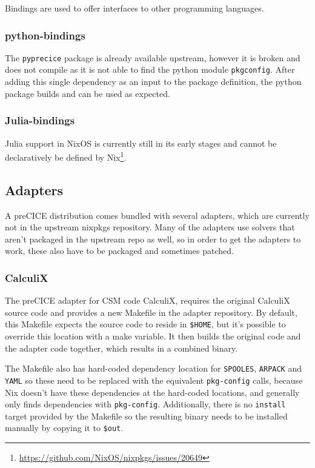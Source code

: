 \documentclass[conference,final,a4paper]{IEEEtran}
\begin{document}
Bindings are used to offer interfaces to other programming languages.

\subsubsection{python-bindings}

The \texttt{pyprecice} package is already available upstream, however it is broken and does not compile as it is not able to find the python module \texttt{pkgconfig}.
After adding this single dependency as an input to the package definition, the python package builds and can be used as expected.

\subsubsection{Julia-bindings}

Julia support in NixOS is currently still in its early stages and cannot be declaratively be defined by Nix\footnote{\url{https://github.com/NixOS/nixpkgs/issues/20649}}.

\subsection{Adapters}

A preCICE distribution comes bundled with several adapters, which are currently not in the upstream nixpkgs repository.
Many of the adapters use solvers that aren't packaged in the upstream repo as well, so in order to get the adapters to work, these also have to be packaged and sometimes patched.\\

\subsubsection{CalculiX}

The preCICE adapter for CSM code CalculiX, requires the original CalculiX source code and provides a new Makefile in the adapter repository.
By default, this Makefile expects the source code to reside in \texttt{\$HOME}, but it's possible to override this location with a make variable.
It then builds the original code and the adapter code together, which results in a combined binary.

The Makefile also has hard-coded dependency location for \texttt{SPOOLES}, \texttt{ARPACK} and \texttt{YAML} so these need to be replaced with the equivalent \texttt{pkg-config} calls, because Nix doesn't have these dependencies at the hard-coded locations, and generally only finds dependencies with \texttt{pkg-config}.
Additionally, there is no \texttt{install} target provided by the Makefile so the resulting binary needs to be installed manually by copying it to \texttt{\$out}.\\
\end{document}
